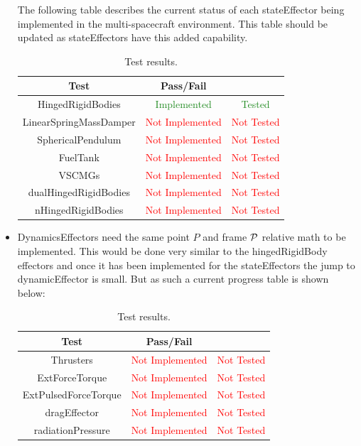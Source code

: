 \begin{itemize}
The following table describes the current status of each stateEffector being implemented in the multi-spacecraft environment. This table should be updated as stateEffectors have this added capability. 

\begin{table}[htbp]
	\caption{Test results.}
	\label{tab:results}
	\centering \fontsize{10}{10}\selectfont
	\begin{tabular}{c | c | c } %
		\hline
		\textbf{Test} 				    & \textbf{Pass/Fail} &  \\ \hline
		HingedRigidBodies  & \textcolor{ForestGreen}{Implemented} & \textcolor{ForestGreen}{Tested} \\
		LinearSpringMassDamper  & \textcolor{Red}{Not Implemented} & \textcolor{Red}{Not Tested} \\ 
		SphericalPendulum  & \textcolor{Red}{Not Implemented} & \textcolor{Red}{Not Tested} \\ 
		FuelTank  & \textcolor{Red}{Not Implemented} & \textcolor{Red}{Not Tested} \\ 
		VSCMGs  & \textcolor{Red}{Not Implemented} & \textcolor{Red}{Not Tested} \\ 
		dualHingedRigidBodies  & \textcolor{Red}{Not Implemented} & \textcolor{Red}{Not Tested} \\ 
		nHingedRigidBodies  & \textcolor{Red}{Not Implemented} & \textcolor{Red}{Not Tested} \\ 
		\hline
	\end{tabular}
\end{table}
\clearpage

\item DynamicsEffectors need the same point $P$ and frame $\cal P$ relative math to be implemented. This would be done very similar to the hingedRigidBody effectors and once it has been implemented for the stateEffectors the jump to dynamicEffector is small. But as such a current progress table is shown below:

\begin{table}[htbp]
	\caption{Test results.}
	\label{tab:results2}
	\centering \fontsize{10}{10}\selectfont
	\begin{tabular}{c | c | c } %
		\hline
		\textbf{Test} 				    & \textbf{Pass/Fail} &  \\ \hline
		Thrusters  & \textcolor{Red}{Not Implemented} & \textcolor{Red}{Not Tested} \\ 
		ExtForceTorque  & \textcolor{Red}{Not Implemented} & \textcolor{Red}{Not Tested} \\ 
		ExtPulsedForceTorque  & \textcolor{Red}{Not Implemented} & \textcolor{Red}{Not Tested} \\ 
		dragEffector  & \textcolor{Red}{Not Implemented} & \textcolor{Red}{Not Tested} \\ 
		radiationPressure  & \textcolor{Red}{Not Implemented} & \textcolor{Red}{Not Tested} \\ 
		\hline
	\end{tabular}
\end{table}


\end{itemize}
